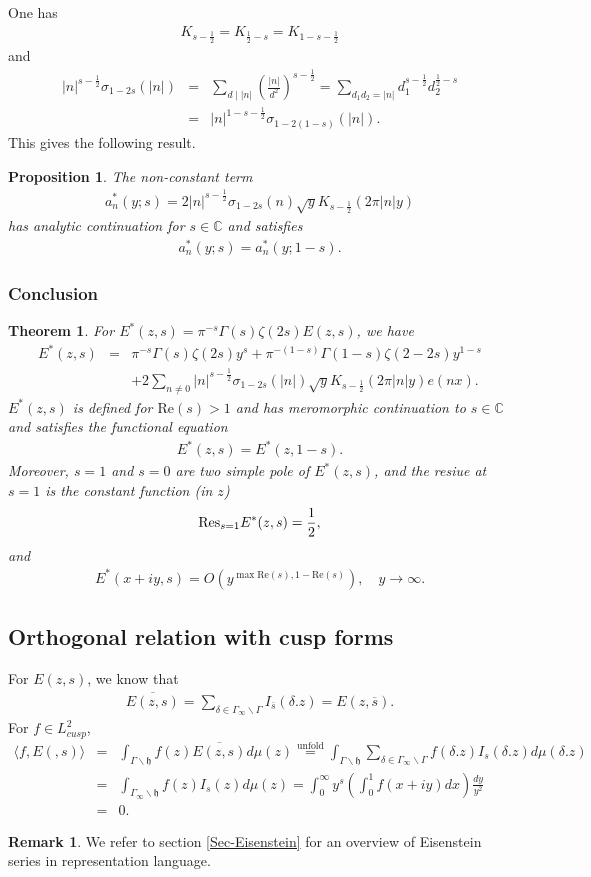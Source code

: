 \documentclass[11pt,reqno]{amsart}
\newcommand{\bna}{\begin{eqnarray*}}
\newcommand{\ena}{\end{eqnarray*}}
\newcommand{\mk}{\mathfrak}
\def\re{{\mathrm{Re}}}
\def\res{{\rm Res}}
\def\C{\mathbb{C}}
\newtheorem{thm}[lemma]{Theorem}
\newtheorem{prop}[lemma]{Proposition}
\theoremstyle{definition}
\newtheorem{remark}{Remark}
\begin{document}
One has
\bna
K_{s-\frac{1}{2}}=K_{\frac{1}{2}-s}=K_{1-s-\frac{1}{2}}
\ena
and
\bna
|n|^{s-\frac{1}{2}}\sigma_{1-2s}(|n|)&=&\sum_{d\mid |n|}
\left(\frac{|n|}{d^2}\right)^{s-\frac{1}{2}}=\sum_{d_1d_2=|n|}d_1^{s-\frac{1}{2}}d_2^{\frac{1}{2}-s}\\
&=&
|n|^{1-s-\frac{1}{2}}\sigma_{1-2(1-s)}(|n|).
\ena
This gives the following result.
\begin{prop}
The non-constant term
\bna
a^*_n(y;s)=
2|n|^{s-\frac{1}{2}}\sigma_{1-2s}(n)\sqrt{y}K_{s-\frac{1}{2}}(2\pi |n|y)
\ena
has analytic continuation for $s\in\C$ and satisfies
\bna
a^*_n(y;s)=a^*_n(y;1-s).
\ena
\end{prop}
\subsubsection{Conclusion}
\begin{thm}For $E^*(z,s)=\pi^{-s}\Gamma(s)\zeta(2s)E(z,s)$, we have
\bna
E^*(z,s)&=&\pi^{-s}\Gamma(s)\zeta(2s)y^{s}
+\pi^{-(1-s)}\Gamma(1-s)\zeta(2-2s)y^{1-s}\\
&&
+2\sum_{n\neq 0}|n|^{s-\frac{1}{2}}\sigma_{1-2s}(|n|)\sqrt{y} K_{s-\frac{1}{2}}(2\pi |n|y) e(nx).
\ena
$E^*(z,s)$ is defined for $\re(s)>1$ and has meromorphic continuation
to $s\in\C$ and satisfies the functional equation
\bna
E^*(z,s)=E^*(z,1-s).
\ena
Moreover, $s=1$ and $s=0$ are two simple pole of $E^*(z,s)$,
and the resiue at $s=1$ is the constant function (in $z$)
\bna
\res_{s=1}E^*(z,s)=\frac{1}{2},
\ena
and
\bna
E^*(x+iy,s)=O\left( y^{\max{\re(s),1-\re(s)}}\right),\quad y\rightarrow\infty.
\ena
\end{thm}

\subsection{Orthogonal relation with cusp forms}
For $E(z,s)$, we know that
\bna
\overline{E(z,s)}=\sum_{\delta\in \Gamma_\infty\backslash\Gamma}I_{\overline s}(\delta.z)
=E(z,\overline s).
\ena
For $f\in L^2_{cusp}$,
\bna
\langle f,E(,s)\rangle&=&\int_{\Gamma\backslash \mk h} f(z)\overline{E(z,s)}d\mu(z)
\overset{\mbox{unfold}}{=}\int_{\Gamma\backslash \mk h} \sum_{\delta\in\Gamma_\infty\backslash\Gamma}f(\delta.z)
I_{s}(\delta.z)d\mu(\delta.z)\\
&=&\int_{\Gamma_\infty\backslash \mk h} f(z)
I_{s}(z)d\mu(z)
=\int_0^\infty y^s\left(\int_0^1 f(x+iy)dx\right)\frac{dy}{y^2}\\
&=&0.
\ena

\begin{remark}
We refer to section \ref{Sec-Eisenstein} for an overview of Eisenstein series in
representation language.
\end{remark}
\end{document}
